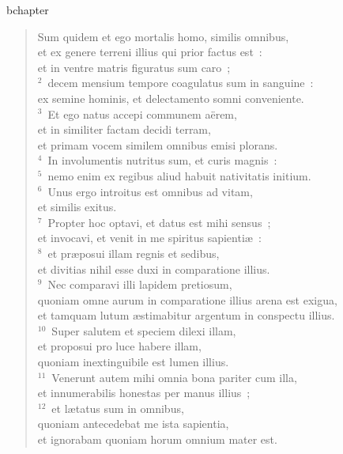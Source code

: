 bchapter\begin{flushleft}\begin{verse}\vspace{-19pt}Sum quidem et ego mortalis homo, similis omnibus,\\ et ex genere terreni illius qui prior factus est~:\\ et in ventre matris figuratus sum caro~;\\
${}^{2}$~decem mensium tempore coagulatus sum in sanguine~:\\ ex semine hominis, et delectamento somni conveniente.\\
${}^{3}$~Et ego natus accepi communem a\"erem,\\ et in similiter factam decidi terram,\\ et primam vocem similem omnibus emisi plorans.\\
${}^{4}$~In involumentis nutritus sum, et curis magnis~:\\
${}^{5}$~nemo enim ex regibus aliud habuit nativitatis initium.\\
${}^{6}$~Unus ergo introitus est omnibus ad vitam,\\ et similis exitus.\\
${}^{7}$~Propter hoc optavi, et datus est mihi sensus~;\\ et invocavi, et venit in me spiritus sapienti\ae~:\\
${}^{8}$~et pr\ae posui illam regnis et sedibus,\\ et divitias nihil esse duxi in comparatione illius.\\
${}^{9}$~Nec comparavi illi lapidem pretiosum,\\ quoniam omne aurum in comparatione illius arena est exigua,\\ et tamquam lutum \ae stimabitur argentum in conspectu illius.\\
${}^{10}$~Super salutem et speciem dilexi illam,\\ et proposui pro luce habere illam,\\ quoniam inextinguibile est lumen illius.\\
${}^{11}$~Venerunt autem mihi omnia bona pariter cum illa,\\ et innumerabilis honestas per manus illius~;\\
${}^{12}$~et l\ae tatus sum in omnibus,\\ quoniam antecedebat me ista sapientia,\\ et ignorabam quoniam horum omnium mater est.\\

\end{verse}
\end{flushleft}
